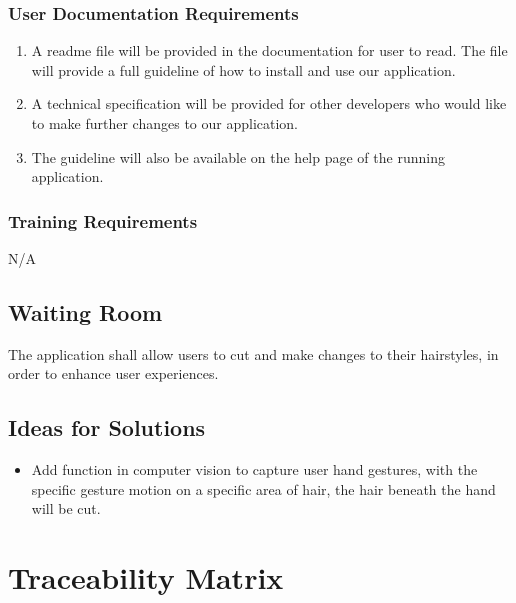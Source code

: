 \documentclass[12pt]{article}
\begin{document}
\subsubsection{User Documentation Requirements}
\begin{enumerate}
    \item A readme file will be provided in the documentation for user to read. The file will provide a full guideline of how to install and use our application.
    \item A technical specification will be provided for other developers who would like to make further changes to our application.
    \item The guideline will also be available on the help page of the running application.
\end{enumerate}
\subsubsection{Training Requirements}
N/A

\subsection{Waiting Room}

The application shall allow users to cut and make changes to their hairstyles, in order to enhance user experiences.

\subsection{Ideas for Solutions}
\begin{itemize}
    \item Add function in computer vision to capture user hand gestures, with the specific gesture motion on a specific area of hair, the hair beneath the hand will be cut.
\end{itemize}

\section{Traceability Matrix}
\end{document}
